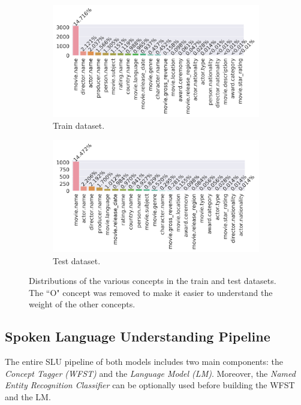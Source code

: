 \documentclass[11pt,a4paper]{article}
\begin{document}
\begin{figure}
	\begin{subfigure}[b]{0.5\linewidth}
		\includegraphics[width=\linewidth]{img/train-concepts-distribution}
		\caption{Train dataset.}
	\end{subfigure}
	\begin{subfigure}[b]{0.5\linewidth}
	\includegraphics[width=\textwidth]{img/test-concepts-distribution}
	\caption{Test dataset.}
	\end{subfigure}
	\caption{Distributions of the various concepts in the train and test datasets. The ``O" concept was removed to make it easier to understand the weight of the other concepts.}
	\label{fig:concept-distribution}
\end{figure}

\subsection{Spoken Language Understanding Pipeline}

The entire SLU pipeline of both models includes two main components: the \textit{Concept Tagger (WFST)} and the \textit{Language Model (LM)}. Moreover, the \textit{Named Entity Recognition Classifier} can be optionally used before building the WFST and the LM. 
\end{document}

